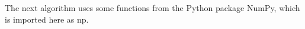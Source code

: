 The next algorithm uses some functions from the Python package NumPy, which is imported here as $\mathrm{np}$.



